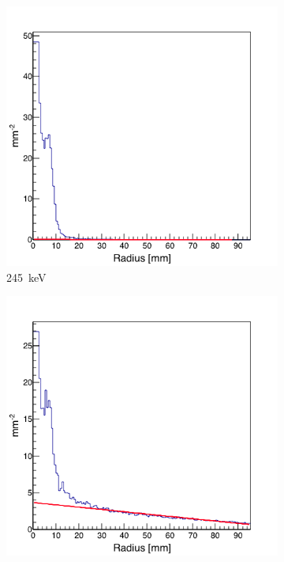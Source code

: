 \begin{figure}
\begin{subfigure}{.5\textwidth}
  \centering
  \includegraphics[width=.9\linewidth]{03_GraphicFiles/chapter4/SPECT/anger/radial_distr/fit_245keV}
  \caption{245~keV}
  \label{fig:rad_distr_fit_245keV}
\end{subfigure}
\begin{subfigure}{.5\textwidth}
  \centering
  \includegraphics[width=.9\linewidth]{03_GraphicFiles/chapter4/SPECT/anger/radial_distr/fit_555keV}

\end{subfigure}
\end{figure}
